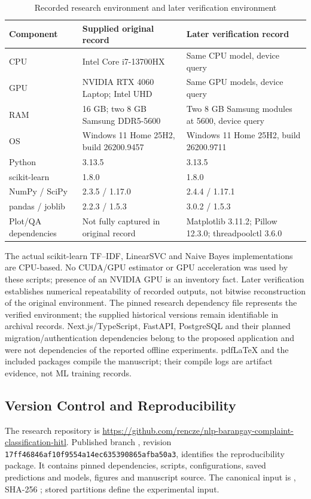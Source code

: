 \begin{table}[H]\centering\caption{Recorded research environment and later verification environment}\label{tab:environment-final}\small\begin{tabularx}{\textwidth}{p{}XX}\toprule Component & Supplied original record & Later verification record\\\midrule
CPU & Intel Core i7-13700HX & Same CPU model, device query\\
GPU & NVIDIA RTX 4060 Laptop; Intel UHD & Same GPU models, device query\\
RAM & 16 GB; two 8 GB Samsung DDR5-5600 & Two 8 GB Samsung modules at 5600, device query\\
OS & Windows 11 Home 25H2, build 26200.9457 & Windows 11 Home 25H2, build 26200.9711\\
Python & 3.13.5 & 3.13.5\\
scikit-learn & 1.8.0 & 1.8.0\\
NumPy / SciPy & 2.3.5 / 1.17.0 & 2.4.4 / 1.17.1\\
pandas / joblib & 2.2.3 / 1.5.3 & 3.0.2 / 1.5.3\\
Plot/QA dependencies & Not fully captured in original record & Matplotlib 3.11.2; Pillow 12.3.0; threadpoolctl 3.6.0\\\bottomrule\end{tabularx}\end{table}

The actual scikit-learn TF--IDF, LinearSVC and Naive Bayes implementations are CPU-based. No CUDA/GPU estimator or GPU acceleration was used by these scripts; presence of an NVIDIA GPU is an inventory fact. Later verification establishes numerical repeatability of recorded outputs, not bitwise reconstruction of the original environment. The pinned research dependency file represents the verified environment; the supplied historical versions remain identifiable in archival records. Next.js/TypeScript, FastAPI, PostgreSQL and their planned migration/authentication dependencies belong to the proposed application and were not dependencies of the reported offline experiments. pdfLaTeX and the included packages compile the manuscript; their compile logs are artifact evidence, not ML training records.



\subsection{Version Control and Reproducibility}\label{sec:reproducibility-final}
The research repository is \url{https://github.com/rencze/nlp-barangay-complaint-classification-hitl}. Published branch , revision \texttt{17ff46846af10f9554a14ec635390865afba50a3}, identifies the reproducibility package. It contains pinned dependencies, scripts, configurations, saved predictions and models, figures and manuscript source. The canonical input is , SHA-256 ; stored partitions define the experimental input.

